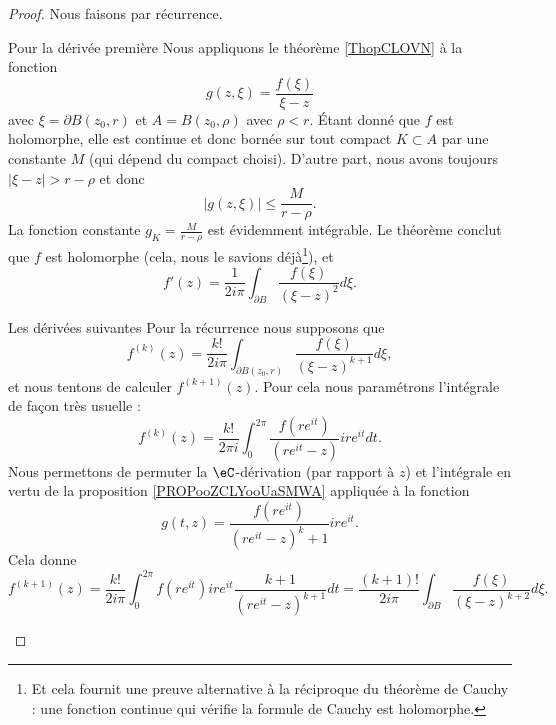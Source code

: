 \begin{proof}
    Nous faisons par récurrence.
    \begin{subproof}
    \item[Pour la dérivée première]
        Nous appliquons le théorème \ref{ThopCLOVN} à la fonction
        \begin{equation}
            g(z,\xi)=\frac{ f(\xi) }{ \xi-z }
        \end{equation}
        avec \( \xi=\partial B(z_0,r)\) et \( A=B(z_0,\rho)\) avec \( \rho<r\). Étant donné que \( f\) est holomorphe, elle est continue et donc bornée sur tout compact \( K\subset A\) par une constante \( M\) (qui dépend du compact choisi).  D'autre part, nous avons toujours \( | \xi-z |>r-\rho\) et donc
        \begin{equation}
            | g(z,\xi) |\leq \frac{ M }{ r-\rho }.
        \end{equation}
        La fonction constante \( g_K=\frac{ M }{ r-\rho }\) est évidemment intégrable. Le théorème conclut que \( f\) est holomorphe (cela, nous le savions déjà\footnote{Et cela fournit une preuve alternative à la réciproque du théorème de Cauchy : une fonction continue qui vérifie la formule de Cauchy est holomorphe.}), et
        \begin{equation}
            f'(z)=\frac{1}{ 2i\pi }\int_{\partial B}\frac{ f(\xi) }{ (\xi-z)^2 }d\xi.
        \end{equation}

        \item[Les dérivées suivantes]
            Pour la récurrence\cite{ooKZJHooZhNpkf} nous supposons que
            \begin{equation}
                f^{(k)}(z)=\frac{k!}{ 2i\pi }\int_{\partial B(z_0,r)}\frac{ f(\xi) }{ (\xi-z)^{k+1} }d\xi,
            \end{equation}
            et nous tentons de calculer \( f^{(k+1)}(z)\). Pour cela nous paramétrons l'intégrale de façon très usuelle :
            \begin{equation}
                f^{(k)}(z)=\frac{ k! }{ 2\pi i }\int_0^{2\pi}\frac{ f(r e^{it}) }{ (r e^{it}-z) }ir e^{it}dt.
            \end{equation}
            Nous permettons de permuter la \( \eC\)-dérivation (par rapport à \( z\)) et l'intégrale en vertu de la proposition \ref{PROPooZCLYooUaSMWA} appliquée à la fonction
            \begin{equation}
                g(t,z)=\frac{ f(r e^{it}) }{ (r e^{it}-z)^k+1 }ir e^{it}.
            \end{equation}
            Cela donne
            \begin{equation}
                f^{(k+1)}(z)=\frac{ k! }{ 2i\pi }\int_0^{2\pi}f(r e^{it})ir e^{it}\frac{ k+1 }{ (r e^{it}-z)^{k+1} }dt=\frac{ (k+1)! }{ 2i\pi }\int_{\partial B}\frac{ f(\xi) }{ (\xi-z)^{k+2} }d\xi.
            \end{equation}
    \end{subproof}
\end{proof}

